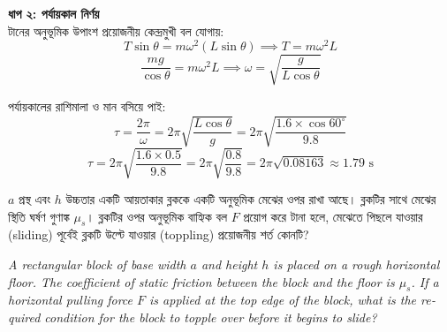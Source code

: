 \documentclass[12pt, a4paper]{article}
\begin{document}
{{\begin{tcolorbox}[solutionbox={সমাধান (Solution)}]
    \vspace{0.5em}
    \noindent\textbf{ধাপ ২: পর্যায়কাল নির্ণয়} \\
    টানের অনুভূমিক উপাংশ প্রয়োজনীয় কেন্দ্রমুখী বল যোগায়:
    \[ T \sin\theta = m \omega^2 (L \sin\theta) \implies T = m \omega^2 L \]
    \[ \frac{mg}{\cos\theta} = m \omega^2 L \implies \omega = \sqrt{\frac{g}{L \cos\theta}} \]
    
    পর্যায়কালের রাশিমালা ও মান বসিয়ে পাই:
    \[ \tau = \frac{2\pi}{\omega} = 2\pi \sqrt{\frac{L \cos\theta}{g}} = 2\pi \sqrt{\frac{1.6 \times \cos 60^\circ}{9.8}} \]
    \[ \tau = 2\pi \sqrt{\frac{1.6 \times 0.5}{9.8}} = 2\pi \sqrt{\frac{0.8}{9.8}} = 2\pi \sqrt{0.08163} \approx \mathbf{1.79}\text{ s} \]
\end{tcolorbox}

\newpage

\begin{tcolorbox}[questionbox={প্রশ্ন (Question) 49}]
    \noindent
    $a$ প্রস্থ এবং $h$ উচ্চতার একটি আয়তাকার ব্লককে একটি অনুভূমিক মেঝের ওপর রাখা আছে। ব্লকটির সাথে মেঝের স্থিতি ঘর্ষণ গুণাঙ্ক $\mu_s$। ব্লকটির ওপর অনুভূমিক বাহ্যিক বল $F$ প্রয়োগ করে টানা হলে, মেঝেতে পিছলে যাওয়ার (sliding) পূর্বেই ব্লকটি উল্টে যাওয়ার (toppling) প্রয়োজনীয় শর্ত কোনটি?
    
    \vspace{0.8em}
    \begin{english}
    \noindent\textit{\color{darkgray}
    A rectangular block of base width $a$ and height $h$ is placed on a rough horizontal floor. The coefficient of static friction between the block and the floor is $\mu_s$. If a horizontal pulling force $F$ is applied at the top edge of the block, what is the required condition for the block to topple over before it begins to slide?
    }
    \end{english}
\end{tcolorbox}

\vspace{1em}
\begin{center}
\end{center}}}
\end{document}
